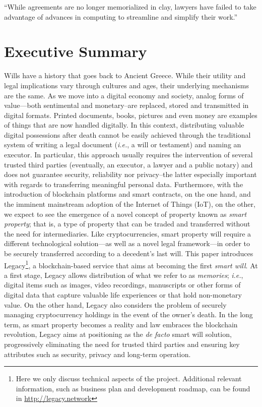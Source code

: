 \begin{savequote}[0.55\linewidth]
	``While agreements are no longer memorialized in clay, lawyers have failed to take advantage of advances in computing to streamline and simplify their work.''
\end{savequote}

\chapter{Executive Summary} %
\label{cha:executive_summary}

Wills have a history that goes back to Ancient Greece. While their utility and legal implications vary through cultures and ages, their underlying mechanisms are the same. As we move into a digital economy and society, analog forms of value---both sentimental and monetary--are replaced, stored and transmitted in digital formats. Printed documents, books, pictures and even money are examples of things that are now handled digitally. In this context, distributing valuable digital possessions after death cannot be easily achieved through the traditional system of writing a legal document (\textit{i.e.}, a will or testament) and naming an executor. In particular, this approach usually requires the intervention of several trusted third parties (eventually, an executor, a lawyer and a public notary) and does not guarantee security, reliability nor privacy--the latter especially important with regards to transferring meaningful personal data. Furthermore, with the introduction of blockchain platforms and smart contracts, on the one hand, and the imminent mainstream adoption of the Internet of Things (IoT), on the other, we expect to see the emergence of a novel concept of property known as \textit{smart property}; that is, a type of property that can be traded and transferred without the need for intermediaries. Like cryptocurrencies, smart property will require a different technological solution---as well as a novel legal framework---in order to be securely transferred according to a decedent's last will.
This paper introduces Legacy\footnote{Here we only discuss technical aspects of the project. Additional relevant information, such as business plan and development roadmap, can be found in \url{http://legacy.network}}, a blockchain-based service that aims at becoming the first \textit{smart will}. At a first stage, Legacy allows distribution of what we refer to as \textit{memories}; \textit{i.e.}, digital items such as images, video recordings, manuscripts or other forms of digital data that capture valuable life experiences or that hold non-monetary value.
On the other hand, Legacy also considers the problem of securely managing cryptocurrency holdings in the event of the owner's death. 
In the long term, as smart property becomes a reality and law embraces the blockchain revolution, Legacy aims at positioning as the \textit{de facto} smart will solution, progressively eliminating the need for trusted third parties and ensuring key attributes such as security, privacy and long-term operation.

